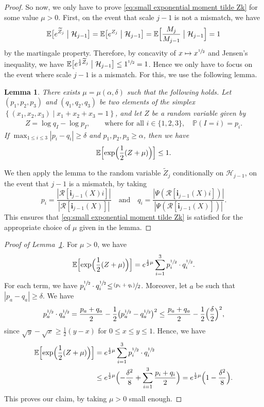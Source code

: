 \documentclass[11pt]{article}
\newcommand{\psfrac}[2]{\sfrac{(#1)}{#2}}
\newcommand{\BEc}[1]{\mathbb{E} \Bigl[#1\Bigr]}
\newcommand{\Pp}[1]{\mathbb{P} \left(#1\right)}
\newcommand{\bEcsq}[2]{\mathbb{E} \bigl[#1\bigm| #2\bigr]}
\newcommand{\BEcsq}[2]{\mathbb{E} \Bigl[#1\bigm|#2\Bigr]}
\newcommand{\enstq}[2]{\left\lbrace#1\mathrel{}\middle|\mathrel{}#2\right\rbrace}
\newcommand{\Rr}{\mathcal{R}}
\newcommand{\ii}{\mathbf{i}}
\theoremstyle{plain}
\newtheorem{lemma}[theorem]{Lemma}
\theoremstyle{definition}
\numberwithin{equation}{section}
\begin{document}
\begin{proof}
So now, we only have to prove \eqref{eq:small exponential moment tilde Zk} for some value $\mu>0$.
First, on the event that scale $j-1$ is not a mismatch, we have
\begin{align*}
\bEcsq{e^{\widetilde Z_j}}{\mathcal H_{j-1}}= \bEcsq{e^{Z_j}}{\mathcal H_{j-1}}= \BEcsq{\frac{M_j}{M_{j-1}}}{\mathcal H_{j-1}}=1
\end{align*}
by the martingale property. Therefore, by concavity of $x\mapsto x^{\sfrac{1}{2}}$ and Jensen's inequality, we have $\bEcsq{e^{\frac12 \widetilde Z_j}}{\mathcal H_{j-1}}\leq 1^{\sfrac{1}{2}} =1$.
Hence we only have to focus on the event where scale $j-1$ is a mismatch.
For this, we use the following lemma.
\begin{lemma}\label{lem:small exponential moment for Z+c}
There exists $\mu=\mu(\alpha,\delta)$ such that the following holds.
Let $(p_1,p_2,p_3)$ and $(q_1,q_2,q_3)$ be two elements of the simplex $\enstq{(x_1,x_2,x_3)}{x_1+x_2+x_3=1}$, and let $Z$ be a random variable given by
\begin{align*}
Z= \log q_I - \log p_I,\qquad \text{where for all } i\in \{1,2,3\}, \quad \Pp{I=i}=p_i.
\end{align*}
If $\max_{1 \leq i \leq 3}|p_i-q_i| \geq \delta$ and $p_1,p_2,p_3\geq \alpha$,
then we have
\begin{align}
\BEc{\exp\Bigl(\frac{1}{2} (Z + \mu )\Bigr)}\leq 1.
\end{align}
\end{lemma}
We then apply the lemma to the random variable $\widetilde{Z}_j$ conditionally on $\mathcal{H}_{j-1}$, on the event that $j-1$ is a mismatch, by taking
\[
p_i= \frac{\left| \Rr[\ii_{j-1}(X)i] \right|}{\left| \Rr[\ii_{j-1}(X)] \right|}\quad\text{and}\quad q_i= \frac{\left| \Psi \left( \Rr[\ii_{j-1}(X)i] \right) \right|}{\left| \Psi \left( \Rr[\ii_{j-1}(X)] \right) \right|}.
\]
This ensures that \eqref{eq:small exponential moment tilde Zk} is satisfied for the appropriate choice of $\mu$ given in the lemma.
\end{proof}

\begin{proof}[Proof of Lemma~\ref{lem:small exponential moment for Z+c}]
For $\mu>0$, we have
\[ \BEc{\exp \Bigl( \frac12(Z+\mu)\Bigr)} = e^{\frac12 \mu} \sum_{i=1}^3 p_i^{\sfrac12}\cdot q_i^{\sfrac12}. \]
For each term, we have $p_i^{\sfrac12} \cdot q_i^{\sfrac12}\!\leq\! \psfrac{p_i+q_i}{2}$. Moreover, let $a$ be such that $|p_a-q_a|\!\geq\! \delta$. We have
\[ p_a^{\sfrac12} \cdot q_a^{\sfrac12} = \frac{p_a+q_a}{2} - \frac{1}{2} \bigl( p_a^{\sfrac12}-q_a^{\sfrac12} \bigr)^2 \leq \frac{p_a+q_a}{2} - \frac{1}{2} \Bigl( \frac{\delta}{2} \Bigr)^2,\]
since $\sqrt{y}-\sqrt{x} \geq \frac{1}{2}(y-x)$ for $0 \leq x \leq y \leq 1$. Hence, we have
\begin{align*}
\BEc{\exp \Bigl( \frac12(Z+\mu) \Bigr)} &= e^{\frac12 \mu} \sum_{i=1}^3 p_i^{\sfrac12} \cdot q_i^{\sfrac12}\\
& \leq e^{\frac12 \mu} \Bigl( -\frac{\delta^2}{8} + \sum_{i=1}^3 \frac{p_i+q_i}{2} \Bigr)= e^{\frac12 \mu} \Bigl( 1-\frac{\delta^2}{8} \Bigr).
\end{align*}
This proves our claim, by taking $\mu>0$ small enough.
\end{proof}
\end{document}
